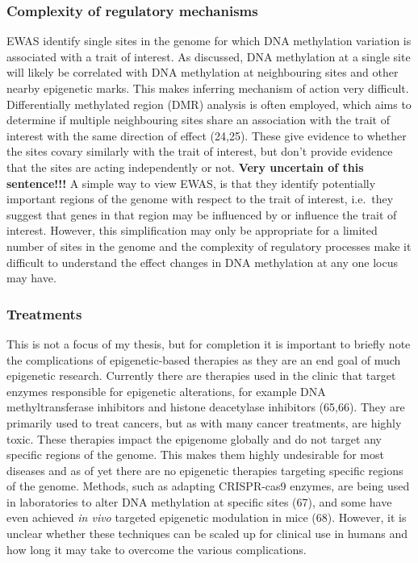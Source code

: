 \documentclass[11pt,twoside]{bristolthesis}
\begin{document}
\hypertarget{complexity-of-regulatory-mechanisms}{%
\subsubsection{Complexity of regulatory mechanisms}\label{complexity-of-regulatory-mechanisms}}

EWAS identify single sites in the genome for which DNA methylation variation is associated with a trait of interest. As discussed, DNA methylation at a single site will likely be correlated with DNA methylation at neighbouring sites and other nearby epigenetic marks. This makes inferring mechanism of action very difficult. Differentially methylated region (DMR) analysis is often employed, which aims to determine if multiple neighbouring sites share an association with the trait of interest with the same direction of effect (24,25). These give evidence to whether the sites covary similarly with the trait of interest, but don't provide evidence that the sites are acting independently or not. \textbf{Very uncertain of this sentence!!!} A simple way to view EWAS, is that they identify potentially important regions of the genome with respect to the trait of interest, i.e.~they suggest that genes in that region may be influenced by or influence the trait of interest. However, this simplification may only be appropriate for a limited number of sites in the genome and the complexity of regulatory processes make it difficult to understand the effect changes in DNA methylation at any one locus may have.

\hypertarget{treatments}{%
\subsubsection{Treatments}\label{treatments}}

This is not a focus of my thesis, but for completion it is important to briefly note the complications of epigenetic-based therapies as they are an end goal of much epigenetic research. Currently there are therapies used in the clinic that target enzymes responsible for epigenetic alterations, for example DNA methyltransferase inhibitors and histone deacetylase inhibitors (65,66). They are primarily used to treat cancers, but as with many cancer treatments, are highly toxic. These therapies impact the epigenome globally and do not target any specific regions of the genome. This makes them highly undesirable for most diseases and as of yet there are no epigenetic therapies targeting specific regions of the genome. Methods, such as adapting CRISPR-cas9 enzymes, are being used in laboratories to alter DNA methylation at specific sites (67), and some have even achieved \emph{in vivo} targeted epigenetic modulation in mice (68). However, it is unclear whether these techniques can be scaled up for clinical use in humans and how long it may take to overcome the various complications.
\end{document}
